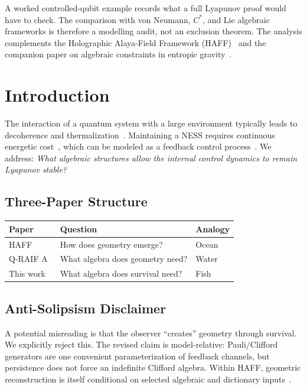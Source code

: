 \documentclass[12pt,a4paper,openany]{book}
\begin{document}
A worked controlled-qubit example records what a full Lyapunov proof
would have to check.  The comparison with von Neumann, $C^*$, and Lie
algebraic frameworks is therefore a modelling audit, not an exclusion
theorem.
The analysis complements the Holographic Alaya-Field Framework (HAFF)~\cite{Liu2026PaperA,Liu2026PaperB} and the companion paper on algebraic constraints in entropic gravity~\cite{Liu2026QRAIF_A}.




\section{Introduction}
\label{B-sec:intro}

The interaction of a quantum system with a large environment typically leads to decoherence and thermalization~\cite{Breuer2002,Weiss2012}.
Maintaining a NESS requires continuous energetic cost~\cite{Seifert2012,Jarzynski2011}, which can be modeled as a feedback control process~\cite{Sagawa2012,Parrondo2015}.
We address: \textit{What algebraic structures allow the internal control dynamics to remain Lyapunov stable?}

\subsection{Three-Paper Structure}

\begin{center}
\begin{tabular}{@{}lll@{}}
\toprule
\textbf{Paper} & \textbf{Question} & \textbf{Analogy} \\
\midrule
HAFF~\cite{Liu2026PaperA} & How does geometry emerge? & Ocean \\
Q-RAIF A~\cite{Liu2026QRAIF_A} & What algebra does geometry need? & Water \\
This work & What algebra does survival need? & Fish \\
\bottomrule
\end{tabular}
\end{center}

\subsection{Anti-Solipsism Disclaimer}

A potential misreading is that the observer ``creates'' geometry through survival.
We explicitly reject this.
The revised claim is model-relative: Pauli/Clifford generators are one convenient parameterization of feedback channels, but persistence does not force an indefinite Clifford algebra.  Within HAFF, geometric reconstruction is itself conditional on selected algebraic and dictionary inputs~\cite{Liu2026PaperB}.
\end{document}
